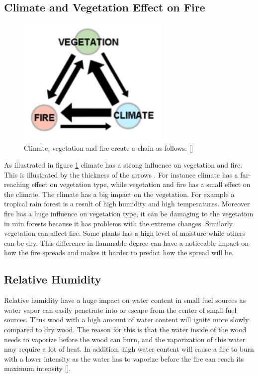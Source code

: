 \subsection{Climate and Vegetation Effect on Fire}
\begin{figure}[here]
  \centering
      \includegraphics[width=0.65\textwidth]{theory/graphics/fire-climate.png}
  \caption{Climate, vegetation and fire create a chain as follows: [] }
  \label{fig:fire-climate}
\end{figure}
As illustrated in figure \ref{fig:fire-climate} climate has a strong influence on vegetation and fire. This is illustrated by the thickness of the arrows . For instance climate has a far-reaching effect on vegetation type, while vegetation and fire has a small effect on the climate. The climate has a big impact on the vegetation. For example a tropical rain forest is a result of high humidity and high temperatures. Moreover fire has a huge influence on vegetation type, it can be damaging to the vegetation in rain forests because it has problems with the extreme changes. Similarly vegetation can affect fire. Some plants has a high level of moisture while others can be dry. This difference in flammable degree can have a noticeable impact on how the fire spreads and makes it harder to predict how the spread will be.
\subsection{Relative Humidity}
Relative humidity have a huge impact on water content in small fuel sources as water vapor can easily penetrate into or escape from the center of small fuel sources. Thus wood with a high amount of water content will ignite more slowly compared to dry wood. The reason for this is that the water inside of the wood needs to vaporize before the wood can burn, and the vaporization of this water may require a lot of heat. In addition, high water content will cause a fire to burn with a lower intensity as the water has to vaporize before the fire can reach its maximum intensity [].

